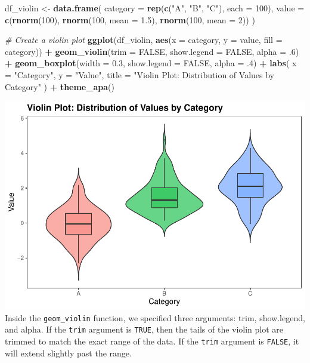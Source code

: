 \documentclass[
]{book}
\newenvironment{Shaded}{\begin{snugshade}}{\end{snugshade}}
\newcommand{\AttributeTok}[1]{\textcolor[rgb]{0.13,0.29,0.53}{#1}}
\newcommand{\CommentTok}[1]{\textcolor[rgb]{0.56,0.35,0.01}{\textit{#1}}}
\newcommand{\ConstantTok}[1]{\textcolor[rgb]{0.56,0.35,0.01}{#1}}
\newcommand{\DecValTok}[1]{\textcolor[rgb]{0.00,0.00,0.81}{#1}}
\newcommand{\FloatTok}[1]{\textcolor[rgb]{0.00,0.00,0.81}{#1}}
\newcommand{\FunctionTok}[1]{\textcolor[rgb]{0.13,0.29,0.53}{\textbf{#1}}}
\newcommand{\NormalTok}[1]{#1}
\newcommand{\OtherTok}[1]{\textcolor[rgb]{0.56,0.35,0.01}{#1}}
\newcommand{\SpecialCharTok}[1]{\textcolor[rgb]{0.81,0.36,0.00}{\textbf{#1}}}
\newcommand{\StringTok}[1]{\textcolor[rgb]{0.31,0.60,0.02}{#1}}
\begin{document}
\begin{Shaded}
\begin{Highlighting}[]
\NormalTok{df\_violin }\OtherTok{\textless{}{-}} \FunctionTok{data.frame}\NormalTok{(}
  \AttributeTok{category =} \FunctionTok{rep}\NormalTok{(}\FunctionTok{c}\NormalTok{(}\StringTok{"A"}\NormalTok{, }\StringTok{"B"}\NormalTok{, }\StringTok{"C"}\NormalTok{), }\AttributeTok{each =} \DecValTok{100}\NormalTok{),}
  \AttributeTok{value =} \FunctionTok{c}\NormalTok{(}\FunctionTok{rnorm}\NormalTok{(}\DecValTok{100}\NormalTok{), }\FunctionTok{rnorm}\NormalTok{(}\DecValTok{100}\NormalTok{, }\AttributeTok{mean =} \FloatTok{1.5}\NormalTok{), }\FunctionTok{rnorm}\NormalTok{(}\DecValTok{100}\NormalTok{, }\AttributeTok{mean =} \DecValTok{2}\NormalTok{))}
\NormalTok{)}

\CommentTok{\# Create a violin plot}
\FunctionTok{ggplot}\NormalTok{(df\_violin, }\FunctionTok{aes}\NormalTok{(}\AttributeTok{x =}\NormalTok{ category, }\AttributeTok{y =}\NormalTok{ value, }\AttributeTok{fill =}\NormalTok{ category)) }\SpecialCharTok{+}
  \FunctionTok{geom\_violin}\NormalTok{(}\AttributeTok{trim =} \ConstantTok{FALSE}\NormalTok{, }
              \AttributeTok{show.legend =} \ConstantTok{FALSE}\NormalTok{, }
              \AttributeTok{alpha =}\NormalTok{ .}\DecValTok{6}\NormalTok{) }\SpecialCharTok{+}
  \FunctionTok{geom\_boxplot}\NormalTok{(}\AttributeTok{width =} \FloatTok{0.3}\NormalTok{, }
               \AttributeTok{show.legend =} \ConstantTok{FALSE}\NormalTok{,}
               \AttributeTok{alpha =}\NormalTok{ .}\DecValTok{4}\NormalTok{) }\SpecialCharTok{+}
  \FunctionTok{labs}\NormalTok{(}
    \AttributeTok{x =} \StringTok{"Category"}\NormalTok{,}
    \AttributeTok{y =} \StringTok{"Value"}\NormalTok{,}
    \AttributeTok{title =} \StringTok{"Violin Plot: Distribution of Values by Category"}
\NormalTok{  ) }\SpecialCharTok{+}
  \FunctionTok{theme\_apa}\NormalTok{()}
\end{Highlighting}
\end{Shaded}

\includegraphics{rintro_demo_files/figure-latex/unnamed-chunk-321-1.pdf}
Inside the \texttt{geom\_violin} function, we specified three arguments: trim, show.legend, and alpha. If the \texttt{trim} argument is \texttt{TRUE}, then the tails of the violin plot are trimmed to match the exact range of the data. If the \texttt{trim} argument is \texttt{FALSE}, it will extend slightly past the range.
\end{document}
